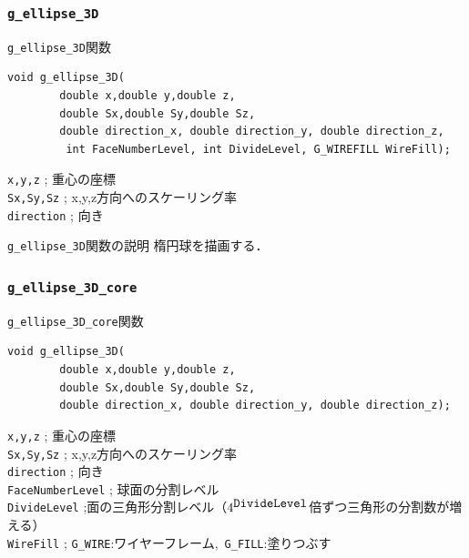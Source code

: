 \documentclass[a4paper,12pt]{jsarticle}%
\begin{document}
\clearpage
\subsubsection{\texttt{g\_ellipse\_3D}}

\begin{itembox}[l]{\texttt{g\_ellipse\_3D}関数}
\begin{verbatim}
void g_ellipse_3D(
        double x,double y,double z,
        double Sx,double Sy,double Sz,
        double direction_x, double direction_y, double direction_z,
         int FaceNumberLevel, int DivideLevel, G_WIREFILL WireFill);   
\end{verbatim}
\verb|x,y,z| ; 重心の座標\\
\verb|Sx,Sy,Sz| ; x,y,z方向へのスケーリング率\\
\verb|direction| ; 向き\\
\end{itembox}

\begin{itembox}[l]{\texttt{g\_ellipse\_3D}関数の説明}
楕円球を描画する．
\end{itembox}



\clearpage
\subsubsection{\texttt{g\_ellipse\_3D\_core}}

\begin{itembox}[l]{\texttt{g\_ellipse\_3D\_core}関数}
\begin{verbatim}
void g_ellipse_3D(
        double x,double y,double z,
        double Sx,double Sy,double Sz,
        double direction_x, double direction_y, double direction_z);   
\end{verbatim}
\verb|x,y,z| ; 重心の座標\\
\verb|Sx,Sy,Sz| ; x,y,z方向へのスケーリング率\\
\verb|direction| ; 向き\\
\verb|FaceNumberLevel| ; 球面の分割レベル\\
\verb|DivideLevel| ;面の三角形分割レベル（$4^{\verb|DivideLevel|}$倍ずつ三角形の分割数が増える）\\
\verb|WireFill| ; \verb|G_WIRE|:ワイヤーフレーム,\ \verb|G_FILL|:塗りつぶす \\
\end{itembox}
\end{document}
